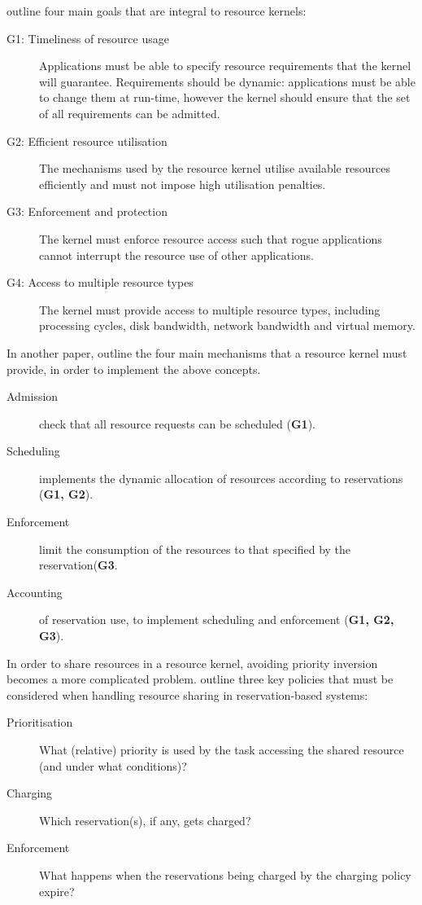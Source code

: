 \citet{Rajkumar_JMO_2001} outline four main goals that are integral to resource kernels:
\begin{description}
	\item[G1: Timeliness of resource usage] Applications must be able to specify resource requirements that the kernel will guarantee.
	Requirements should be dynamic: applications must be able to change them at run-time, however the kernel should ensure that the set of all requirements can be admitted.
\item[G2: Efficient resource utilisation] The mechanisms used by the resource kernel utilise available resources efficiently and must not impose high utilisation penalties.
\item[G3: Enforcement and protection] The kernel must enforce resource access such that rogue applications cannot interrupt the resource use of other applications.
\item[G4: Access to multiple resource types] The kernel must provide access to multiple resource types, including processing cycles, disk bandwidth, network bandwidth and virtual memory.
\end{description}

In another paper, \citet{deNiz_LSR_2001} outline the four main mechanisms that a resource kernel must provide, in order to implement the above concepts.

\begin{description}
	\item[Admission] check that all resource requests can be scheduled (\textbf{G1}).
	\item[Scheduling] implements the dynamic allocation of resources according to reservations (\textbf{G1, G2}).
	\item[Enforcement] limit the consumption of the resources to that specified by the reservation(\textbf{G3}.
	\item[Accounting] of reservation use, to implement scheduling and enforcement (\textbf{G1, G2, G3}).
\end{description}

In order to share resources in a resource kernel, avoiding priority inversion becomes a more complicated problem.
\citet{deNiz_LSR_2001} outline three key policies that must be considered when handling resource sharing in reservation-based systems:

\begin{description}
    \item[Prioritisation] What (relative) priority is used by the task accessing the shared resource (and under what conditions)?
    \item[Charging] Which reservation(s), if any, gets charged?
    \item[Enforcement] What happens when the reservations being charged by the charging policy expire?
\end{description}

